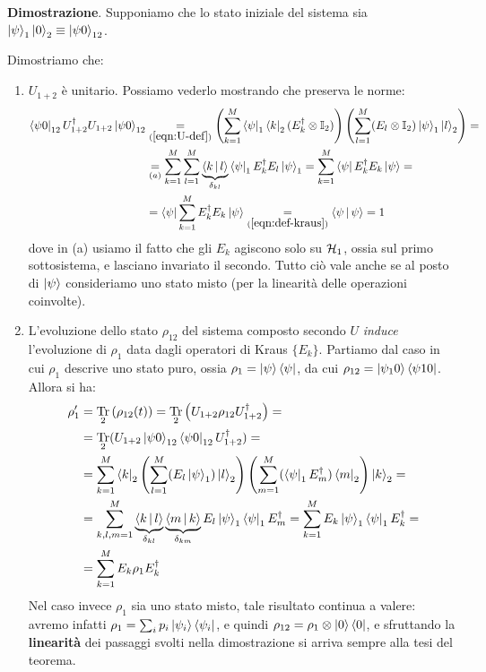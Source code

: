\documentclass[../../InformazioneQuantistica.tex]{subfiles}
\begin{document}
\textbf{Dimostrazione}. Supponiamo che lo stato iniziale del sistema sia $\Ket{\psi}_1\Ket{0}_2 \equiv \Ket{\psi 0}_{12}$.



Dimostriamo che:
\begin{enumerate}
\item $U_{1+2}$ è unitario. Possiamo vederlo mostrando che preserva le norme:
\begin{align*}
\Bra{\psi 0}_{12}U^\dag_{1+2} U_{1+2} \Ket{\psi 0}_{12} &\underset{(\ref{eqn:U-def})}{=} \left(\sum_{k=1}^M \Bra{\psi}_1 \Bra{k}_2 (E_k^\dag \otimes \mathbb{I}_2)\right)
\left( \sum_{l=1}^M (E_l \otimes \mathbb{I}_2) \Ket{\psi}_1 \Ket{l}_2 \right) =\\
&\underset{(a)}{=} \sum_{k=1}^M \sum_{l=1}^M \underbrace{\Braket{k|l}}_{\delta_{kl}} \Bra{\psi}_1E_k^\dag E_l \Ket{\psi}_1 = \sum_{k=1}^M \Bra{\psi}E_k^\dag E_k \Ket{\psi}=\\
&=\Bra{\psi}\sum_{k=1}^M E_k^\dag E_k \Ket{\psi} \underset{(\ref{eqn:def-kraus})}{=}\Braket{\psi|\psi}=1
\end{align*}
dove in (a) usiamo il fatto che gli $E_k$ agiscono solo su $\mathcal{H}_1$, ossia sul primo sottosistema, e lasciano invariato il secondo. Tutto ciò vale anche se al posto di $\Ket{\psi}$ consideriamo uno stato misto (per la linearità delle operazioni coinvolte).
\item L'evoluzione dello stato $\rho_{12}$ del sistema composto secondo $U$ \textit{induce} l'evoluzione di $\rho_1$ data dagli operatori di Kraus $\{E_k\}$. Partiamo dal caso in cui $\rho_1$ descrive uno stato puro, ossia $\rho_1 = \Ket{\psi}\Bra{\psi}$, da cui $\rho_{12}
 = \Ket{\psi_1 0} \Bra{\psi1 0}$. Allora si ha:
\begin{align*}
\rho_1' &= \underset{2}{\operatorname{Tr}}\left(\rho_{12}(t)\right) = \underset{2}{\operatorname{Tr}}\left( U_{1+2} \rho_{12} U_{1+2}^\dag \right)=\\
&= \underset{2}{\operatorname{Tr}}(U_{1+2}\Ket{\psi 0}_{12}\Bra{\psi0}_{12}U^\dag_{1+2}) = \\
&= \sum_{k=1}^M \Bra{k}_2\left(\sum_{l=1}^M (E_l \Ket{\psi}_1)\Ket{l}_2\right) \left(\sum_{m=1}^M (\Bra{\psi}_1 E_m^\dag) \Bra{m}_2 \right)\Ket{k}_2 =\\
&= \sum_{k,l,m=1}^M  \underbrace{\Braket{k|l}}_{\delta_{kl}}\underbrace{\Braket{m|k}}_{\delta_{km}}
E_l \Ket{\psi}_1 \Bra{\psi}_1 E_m^\dag = \sum_{k=1}^M E_k \Ket{\psi}_1\Bra{\psi}_1E_k^\dag =
\\
&= \sum_{k=1}^M E_k \rho_1 E_k^\dag
\end{align*}
Nel caso invece $\rho_1$ sia uno stato misto, tale risultato continua a valere: avremo infatti $\rho_1 = \sum_i p_i \Ket{\psi_i}\Bra{\psi_i}$, e quindi $\rho_{12} = \rho_1 \otimes \Ket{0}\Bra{0}$, e sfruttando la \textbf{linearità} dei passaggi svolti nella dimostrazione si arriva sempre alla tesi del teorema.
\end{enumerate}
\end{document}
